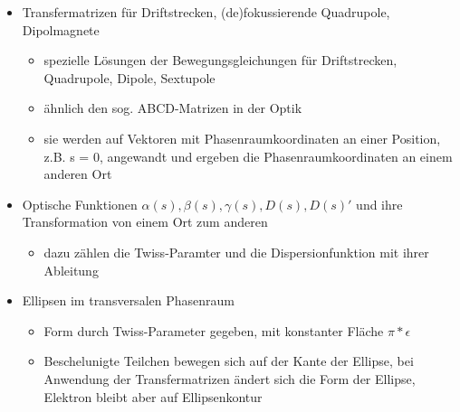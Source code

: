 \documentclass[11pt,a4paper]{article}
\begin{document}
\begin{itemize}
        \item Transfermatrizen für Driftstrecken, (de)fokussierende Quadrupole, Dipolmagnete
            \begin{itemize}
                \item spezielle Lösungen der Bewegungsgleichungen für Driftstrecken, Quadrupole, Dipole, Sextupole
                \item ähnlich den sog. ABCD-Matrizen in der Optik
                \item sie werden auf Vektoren mit Phasenraumkoordinaten an einer Position, z.B. s = 0, angewandt und ergeben die 
                Phasenraumkoordinaten an einem anderen Ort
            \end{itemize}
        \item Optische Funktionen \( \alpha(s), \beta(s), \gamma(s), D(s),  D(s) \prime \) und ihre Transformation von einem Ort zum anderen
            \begin{itemize}
                \item dazu zählen die Twiss-Paramter und die Dispersionfunktion mit ihrer Ableitung 
            \end{itemize}
        \item Ellipsen im transversalen Phasenraum
            \begin{itemize}
                \item Form durch Twiss-Parameter gegeben, mit konstanter Fläche \( \pi*\epsilon \)
                \item Beschelunigte Teilchen bewegen sich auf der Kante der Ellipse, bei Anwendung der Transfermatrizen 
                ändert sich die Form der Ellipse, Elektron bleibt aber auf Ellipsenkontur
            \end{itemize}
            

\end{itemize}
\end{document}
